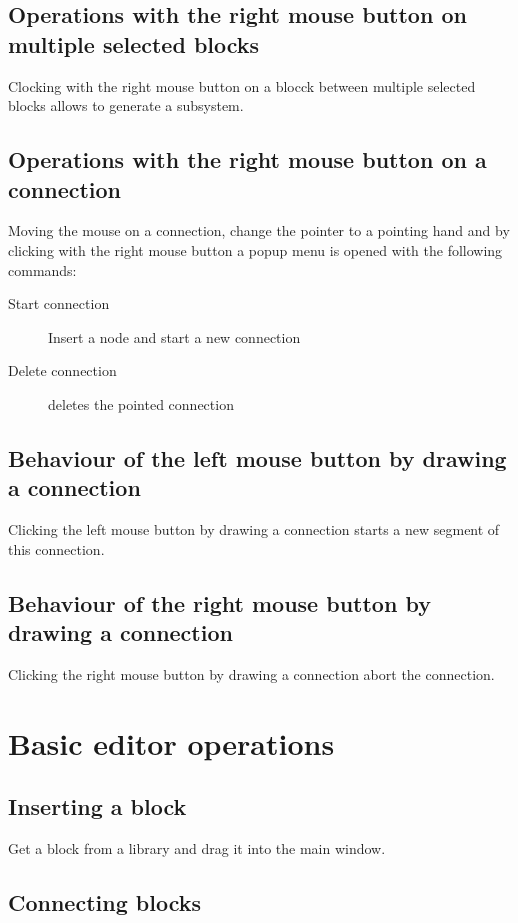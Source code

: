 \subsection{Operations with the right mouse button on multiple selected blocks}

Clocking with the right mouse button on a blocck between multiple selected blocks allows to generate a subsystem.


\subsection{Operations with the right mouse button on a connection}

Moving the mouse on a connection, change the pointer to a pointing hand and by 
clicking with the right mouse button a popup menu is opened with the following 
commands:

\begin{description}
\item[Start connection] Insert a node and start a new connection
\item[Delete connection] deletes the pointed connection
\end{description}

\subsection{Behaviour of the left mouse button by drawing a connection}
Clicking the left mouse button by drawing a connection starts a new segment of this connection.

\subsection{Behaviour of the right mouse button by drawing a connection}
Clicking the right mouse button by drawing a connection abort the connection.

\section{Basic editor operations}

\subsection{Inserting a block}
Get a block from a library and drag it into the main window.

\subsection{Connecting blocks}


